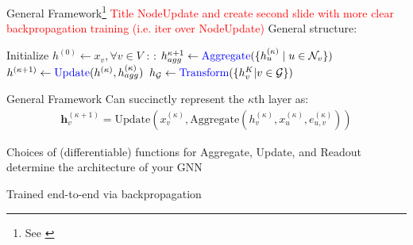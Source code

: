 \documentclass{beamer}
\newcommand{\nhood}{\mathcal{N}}
\newcommand{\Graph}{\mathcal{G}}
\newcommand{\NodeSet}{V}
\newcommand{\node}{v}
\newcommand{\nrepresent}{h}
\newcommand{\edge}{e}
\newcommand{\iter}{\kappa}
\newcommand{\Iter}{K}
\begin{document}
\begin{frame}{
    General Framework\footnote{See \cite{ektefaie_multimodal_2023,gilmer_neural_2017, xu_how_2019}}
    }
    \textcolor{red}{Title NodeUpdate and create second slide with more clear backpropagation training (i.e. iter over NodeUpdate)} \newline
    General structure: 
    
    \begin{algorithmic}[1]
    \State Initialize $\nrepresent^{(0)} \gets x_\node, \forall \node \in \NodeSet$ 
        \For{$\iter = 0, ..., \Iter$}:
            \For{$\node \in \Graph$}:
            \State $\nrepresent_{agg}^{\iter+1} \gets \text{\textcolor{blue}{Aggregate}}(\{h_u^{(\iter)} \mid u \in \nhood_\node\})$ 
            \State $\nrepresent^{(\iter+1)} \gets \text{\textcolor{blue}{Update}}(\nrepresent^{(\iter)}, \nrepresent_{agg}^{(\iter)})$
            \EndFor
        \EndFor
        \State $h_\Graph \gets \text{\textcolor{blue}{Transform}}(\{h^\Iter_\node | \node \in \Graph\})$ 
    \end{algorithmic}   

\end{frame}




\begin{frame}{General Framework}
Can succinctly represent the $\iter$th layer as: 
\begin{gather*}
    \mathbf{h}_\node^{(\iter+1)} 
    =
    \text{Update}
    \left( 
    x_\node^{(\iter)}
    ,   
    \text{Aggregate}
    (
        h_\node^{(\iter)}, x_u^{(\iter)}, \edge_{u,\node}^{(\iter)}
    )
    \right)
\end{gather*}

Choices of (differentiable) functions for Aggregate, Update, and Readout determine the architecture of your GNN 

\vspace{4mm}

Trained end-to-end via backpropagation

\end{frame}
\end{document}
